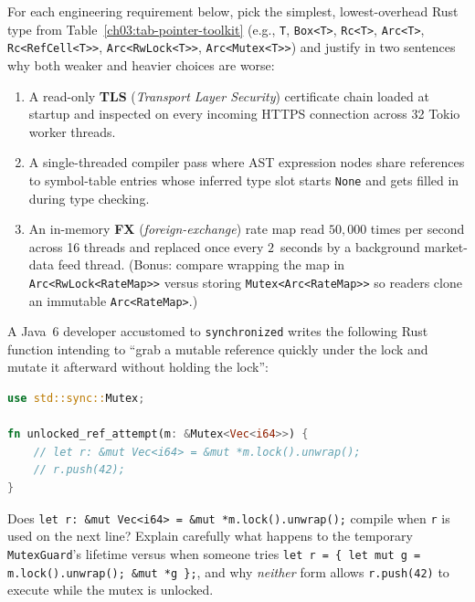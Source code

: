 \begin{exercise}
For each engineering requirement below, pick the simplest, lowest-overhead Rust type from Table~\ref{ch03:tab-pointer-toolkit} (e.g., \texttt{T}, \texttt{Box<T>}, \texttt{Rc<T>}, \texttt{Arc<T>}, \texttt{Rc<RefCell<T>>}, \texttt{Arc<RwLock<T>>}, \texttt{Arc<Mutex<T>>}) and justify in two sentences why both weaker and heavier choices are worse:
\begin{enumerate}
  \item[(a)] A read-only \textbf{TLS} (\emph{Transport Layer Security}) certificate chain loaded at startup and inspected on every incoming HTTPS connection across 32 Tokio worker threads.
  \item[(b)] A single-threaded compiler pass where AST expression nodes share references to symbol-table entries whose inferred type slot starts \texttt{None} and gets filled in during type checking.
  \item[(c)] An in-memory \textbf{FX} (\emph{foreign-exchange}) rate map read $50{,}000$ times per second across 16 threads and replaced once every $2$~seconds by a background market-data feed thread. (Bonus: compare wrapping the map in \texttt{Arc<RwLock<RateMap>>} versus storing \texttt{Mutex<Arc<RateMap>>} so readers clone an immutable \texttt{Arc<RateMap>}.)
\end{enumerate}
\end{exercise}

\begin{exercise}
A Java~6 developer accustomed to \texttt{synchronized} writes the following Rust function intending to ``grab a mutable reference quickly under the lock and mutate it afterward without holding the lock'':
\begin{lstlisting}[language=Rust]
use std::sync::Mutex;

fn unlocked_ref_attempt(m: &Mutex<Vec<i64>>) {
    // let r: &mut Vec<i64> = &mut *m.lock().unwrap();
    // r.push(42);
}
\end{lstlisting}
Does \texttt{let r: \&mut Vec<i64> = \&mut *m.lock().unwrap();} compile when \texttt{r} is used on the next line? Explain carefully what happens to the temporary \texttt{MutexGuard}'s lifetime versus when someone tries \texttt{let r = \{ let mut g = m.lock().unwrap(); \&mut *g \};}, and why \emph{neither} form allows \texttt{r.push(42)} to execute while the mutex is unlocked.
\end{exercise}
